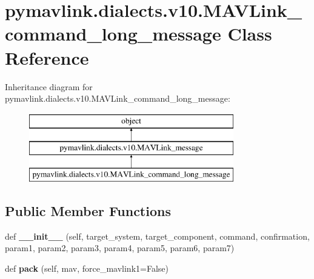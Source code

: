 \hypertarget{classpymavlink_1_1dialects_1_1v10_1_1MAVLink__command__long__message}{}\section{pymavlink.\+dialects.\+v10.\+M\+A\+V\+Link\+\_\+command\+\_\+long\+\_\+message Class Reference}
\label{classpymavlink_1_1dialects_1_1v10_1_1MAVLink__command__long__message}
Inheritance diagram for pymavlink.\+dialects.\+v10.\+M\+A\+V\+Link\+\_\+command\+\_\+long\+\_\+message\+:\begin{figure}[H]
\begin{center}
\leavevmode
\includegraphics[height=3.000000cm]{classpymavlink_1_1dialects_1_1v10_1_1MAVLink__command__long__message}
\end{center}
\end{figure}
\subsection*{Public Member Functions}
\begin{DoxyCompactItemize}
\item 
\mbox{\label{classpymavlink_1_1dialects_1_1v10_1_1MAVLink__command__long__message_a62d4f68de0318da086d937d631ae8a80}} 
def {\bfseries \+\_\+\+\_\+init\+\_\+\+\_\+} (self, target\+\_\+system, target\+\_\+component, command, confirmation, param1, param2, param3, param4, param5, param6, param7)
\item 
\mbox{\label{classpymavlink_1_1dialects_1_1v10_1_1MAVLink__command__long__message_a2ff97ceb05e4dd08f578f5a77a0121eb}} 
def {\bfseries pack} (self, mav, force\+\_\+mavlink1=False)
\end{DoxyCompactItemize}
